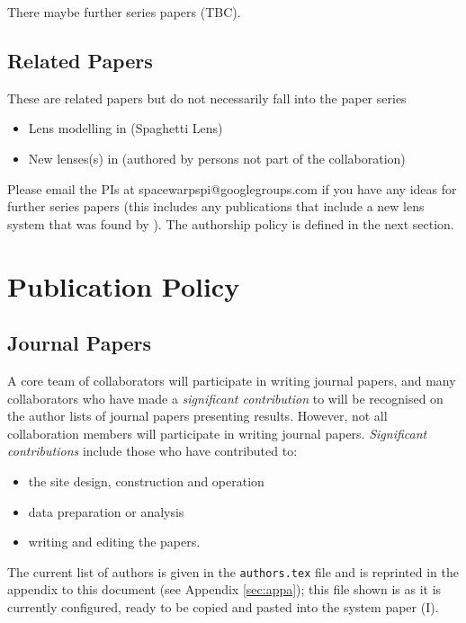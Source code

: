 \documentclass[a4paper]{article}
\begin{document}
There maybe further series papers (TBC).\newline

\subsection{\sw Related Papers}
These are \sw related papers but do not necessarily fall into the \sw paper series
\begin{itemize}
\item Lens modelling in \sw (Spaghetti Lens)
\item New lenses(s) in \sw (authored by persons not part of the \sw collaboration)
\end{itemize}


Please email the \sw PIs at spacewarpspi@googlegroups.com if you have any ideas for further \sw series papers (this includes any publications that include a new lens system that was found by \sw). The authorship policy is defined in the next section.


\section{Publication Policy}
\label{sec:publ}

\subsection{Journal Papers}
\label{sec:series}
A core team of collaborators will participate in writing journal papers, and many collaborators who have made a \textit{significant contribution} to \sw will be recognised on the author
lists of journal papers presenting \sw results.  However, not all collaboration members will participate in writing journal papers.  \textit{Significant contributions} include those who have contributed to:
\begin{itemize}
\item the site design, construction and operation
\item data preparation or analysis
\item writing and editing the papers. 
\end{itemize}


The current list of \sw authors is given in the \texttt{authors.tex} file and is reprinted
in the appendix to this document (see Appendix \ref{sec:appa}); this file shown is as it is currently configured, ready to be copied and pasted into the \sw system paper (\sw I). 
\end{document}
